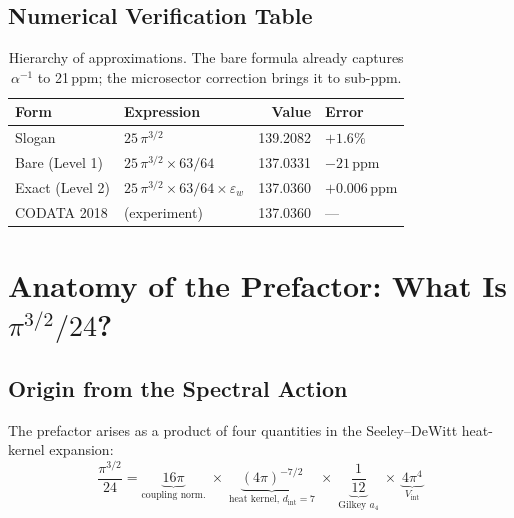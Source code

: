 \documentclass[11pt]{article}
\begin{document}
\subsection{Numerical Verification Table}

\begin{table}[h]
\centering
\begin{tabular}{@{}llrl@{}}
\toprule
\textbf{Form} & \textbf{Expression} & \textbf{Value} & \textbf{Error} \\
\midrule
Slogan       & $25\,\pi^{3/2}$                                 & 139.2082 & $+1.6\%$ \\
Bare (Level 1)& $25\,\pi^{3/2} \times 63/64$                   & 137.0331 & $-21$\,ppm \\
Exact (Level 2)& $25\,\pi^{3/2} \times 63/64 \times \varepsilon_w$ & 137.0360 & $+0.006$\,ppm \\
CODATA 2018  & (experiment)                                      & 137.0360 & --- \\
\bottomrule
\end{tabular}
\caption{Hierarchy of approximations.  The bare formula already captures
$\alpha^{-1}$ to 21\,ppm; the microsector correction brings it to sub-ppm.}
\label{tab:hierarchy}
\end{table}


\section{Anatomy of the Prefactor: What Is $\pi^{3/2}/24$?}
\label{sec:prefactor}

\subsection{Origin from the Spectral Action}

The prefactor arises as a product of four quantities in the Seeley--DeWitt
heat-kernel expansion:
\begin{equation}
\frac{\pi^{3/2}}{24}
= \underbrace{16\pi}_{\text{coupling norm.}}
\;\times\;
\underbrace{(4\pi)^{-7/2}}_{\text{heat kernel, }d_{\mathrm{int}}=7}
\;\times\;
\underbrace{\frac{1}{12}}_{\text{Gilkey }a_4}
\;\times\;
\underbrace{4\pi^4}_{V_{\mathrm{int}}}
\label{eq:prefactor-chain}
\end{equation}
\end{document}

